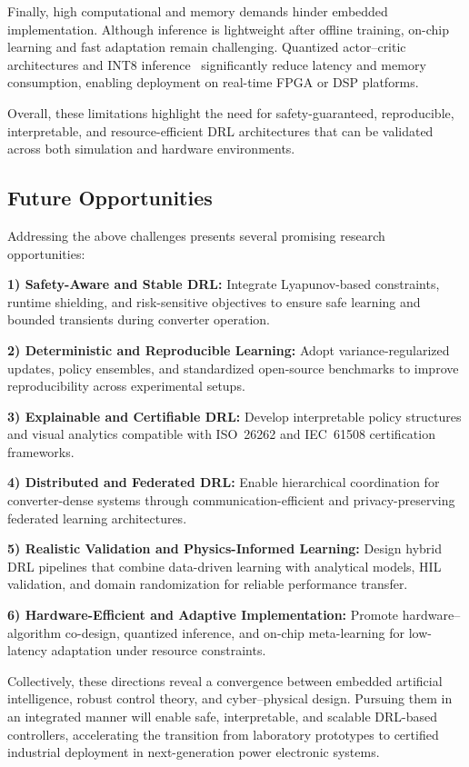 Finally, high computational and memory demands hinder embedded implementation.  
Although inference is lightweight after offline training, on-chip learning and fast adaptation remain challenging.  
Quantized actor–critic architectures and INT8 inference~\cite{Jacob2017QuantizationAT} significantly reduce latency and memory consumption, enabling deployment on real-time FPGA or DSP platforms.

Overall, these limitations highlight the need for safety-guaranteed, reproducible, interpretable, and resource-efficient DRL architectures that can be validated across both simulation and hardware environments.

\subsection{Future Opportunities}

Addressing the above challenges presents several promising research opportunities:

\textbf{1) Safety-Aware and Stable DRL:}  
Integrate Lyapunov-based constraints, runtime shielding, and risk-sensitive objectives to ensure safe learning and bounded transients during converter operation.

\textbf{2) Deterministic and Reproducible Learning:}  
Adopt variance-regularized updates, policy ensembles, and standardized open-source benchmarks to improve reproducibility across experimental setups.

\textbf{3) Explainable and Certifiable DRL:}  
Develop interpretable policy structures and visual analytics compatible with ISO~26262 and IEC~61508 certification frameworks.

\textbf{4) Distributed and Federated DRL:}  
Enable hierarchical coordination for converter-dense systems through communication-efficient and privacy-preserving federated learning architectures.

\textbf{5) Realistic Validation and Physics-Informed Learning:}  
Design hybrid DRL pipelines that combine data-driven learning with analytical models, HIL validation, and domain randomization for reliable performance transfer.

\textbf{6) Hardware-Efficient and Adaptive Implementation:}  
Promote hardware–algorithm co-design, quantized inference, and on-chip meta-learning for low-latency adaptation under resource constraints.

Collectively, these directions reveal a convergence between embedded artificial intelligence, robust control theory, and cyber–physical design.  
Pursuing them in an integrated manner will enable safe, interpretable, and scalable DRL-based controllers, accelerating the transition from laboratory prototypes to certified industrial deployment in next-generation power electronic systems.
